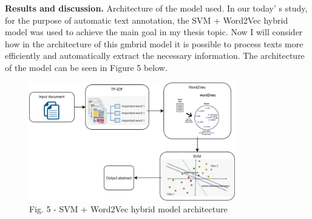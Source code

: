\begin{multicols}{2}
{\bfseries Results and discussion.} Architecture of the model used. In our
today' s study, for the purpose of automatic text
annotation, the SVM + Word2Vec hybrid model was used to achieve the main
goal in my thesis topic. Now I will consider how in the architecture of
this gmbrid model it is possible to process texts more efficiently and
automatically extract the necessary information. The architecture of the
model can be seen in Figure 5 below.
\end{multicols}

\begin{figure}[H]
	\centering
	\includegraphics[width=0.8\textwidth]{media/ict/image26}
	\caption*{Fig. 5 - SVM + Word2Vec hybrid model architecture}
\end{figure}

